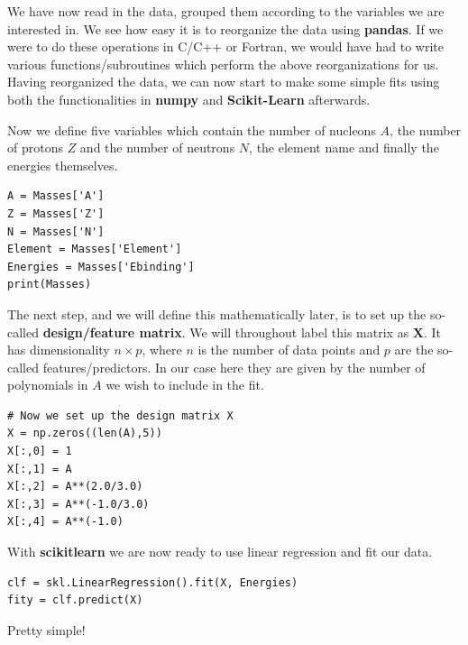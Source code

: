 \documentclass[%
oneside,                 %
final,                   %
10pt]{article}
\begin{document}
We have now read in the data, grouped them according to the variables we are interested in. 
We see how easy it is to reorganize the data using \textbf{pandas}. If we
were to do these operations in C/C++ or Fortran, we would have had to
write various functions/subroutines which perform the above
reorganizations for us.  Having reorganized the data, we can now start
to make some simple fits using both the functionalities in \textbf{numpy} and
\textbf{Scikit-Learn} afterwards. 

Now we define five variables which contain
the number of nucleons $A$, the number of protons $Z$ and the number of neutrons $N$, the element name and finally the energies themselves.
\begin{verbatim}
A = Masses['A']
Z = Masses['Z']
N = Masses['N']
Element = Masses['Element']
Energies = Masses['Ebinding']
print(Masses)
\end{verbatim}
The next step, and we will define this mathematically later, is to set up the so-called \textbf{design/feature matrix}. We will throughout label  this matrix as $\bm{X}$.
It has dimensionality $n\times p$, where $n$ is the number of data points and $p$ are the so-called features/predictors. In our case here they are given by the number of polynomials in $A$ we wish to include in the fit. 
\begin{verbatim}
# Now we set up the design matrix X
X = np.zeros((len(A),5))
X[:,0] = 1
X[:,1] = A
X[:,2] = A**(2.0/3.0)
X[:,3] = A**(-1.0/3.0)
X[:,4] = A**(-1.0)
\end{verbatim}
With \textbf{scikitlearn} we are now ready to use linear regression and fit our data.
\begin{verbatim}
clf = skl.LinearRegression().fit(X, Energies)
fity = clf.predict(X)
\end{verbatim}
Pretty simple!  
\end{document}
